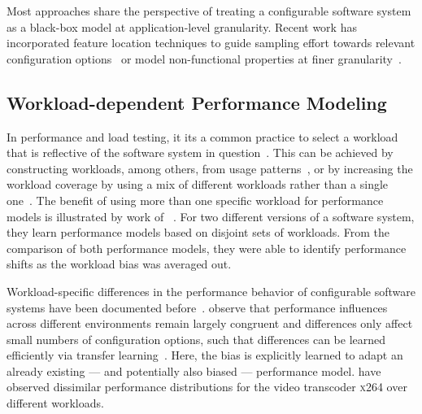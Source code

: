 Most approaches share the perspective of treating a configurable software system as a black-box model at application-level granularity. Recent work has incorporated feature location techniques to guide sampling effort towards relevant configuration options~\cite{velez_2020_configcrusher_jase,velez_comprex_2021} or model non-functional properties at finer granularity~\cite{weber_white_2021}.

\subsection{Workload-dependent Performance Modeling}

In performance and load testing, it its a common practice to select a workload that is reflective of the software system in question~\cite{ceesay2020,papadopoulos2021}. This can be achieved by constructing workloads, among others, from usage patterns~\cite{calzarossa2016}, or by increasing the workload coverage by using a mix of different workloads rather than a single one~\cite{jiang2015survey}.
The benefit of using more than one specific workload for performance models is illustrated by work of \citeauthor{liao_2020_using_emse}~\cite{liao_2020_using_emse}. For two different versions of a software system, they learn performance models based on disjoint sets of workloads. From the comparison of both performance models, they were able to identify performance shifts as the workload bias was averaged out.

Workload-specific differences in the performance behavior of configurable software systems have been documented before~\cite{jamishidi_transfer_2017,alves_sampling_2020}. \citeauthor{jamishidi_transfer_2017} observe that performance influences across different environments remain largely congruent and differences only affect small numbers of configuration options, such that differences can be learned efficiently via transfer learning~\cite{jamishidi_transfer_2017,jamshidi_learning_2018,jamshidi_transfer_gp_2017,ding_bayesian_2020}. Here, the bias is explicitly learned to adapt an already existing --- and potentially also biased --- performance model. \citeauthor{alves_sampling_2020} have observed dissimilar performance distributions for the video transcoder \textsc{x264} over different  workloads.

